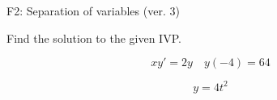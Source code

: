 \begin{exercise}
  \begin{exerciseTitle}F2: Separation of variables (ver. 3)\end{exerciseTitle}
  \begin{exerciseStatement}
    
Find the solution to the given IVP.

    
\[xy'= 2 y \hspace{1em} y( -4 ) = 64\]

  \end{exerciseStatement}
  \begin{exerciseAnswer}
    
\[y= 4 t^ 2\]

  \end{exerciseAnswer}
\end{exercise}